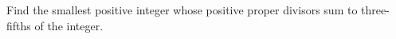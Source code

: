 Find the smallest positive integer whose positive proper divisors sum to three-fifths of the integer.
